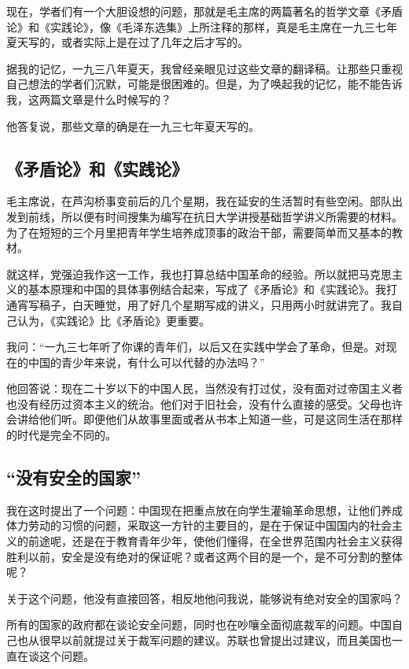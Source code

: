 现在，学者们有一个大胆设想的问题，那就是毛主席的两篇著名的哲学文章《矛盾论》和《实践论》，像《毛泽东选集》上所注释的那样，真是毛主席在一九三七年夏天写的，或者实际上是在过了几年之后才写的。

据我的记忆，一九三八年夏天，我曾经亲眼见过这些文章的翻译稿。让那些只重视自己想法的学者们沉默，可能是很困难的。但是，为了唤起我的记忆，能不能告诉我，这两篇文章是什么时候写的？

他答复说，那些文章的确是在一九三七年夏天写的。

\subsection{《矛盾论》和《实践论》}

毛主席说，在芦沟桥事变前后的几个星期，我在延安的生活暂时有些空闲。部队出发到前线，所以便有时间搜集为编写在抗日大学讲授基础哲学讲义所需要的材料。为了在短短的三个月里把青年学生培养成顶事的政治干部，需要简单而又基本的教材。

就这样，党强迫我作这一工作，我也打算总结中国革命的经验。所以就把马克思主义的基本原理和中国的具体事例结合起来，写成了《矛盾论》和《实践论》。我打通宵写稿子，白天睡觉，用了好几个星期写成的讲义，只用两小时就讲完了。我自己认为，《实践论》比《矛盾论》更重要。

我问：“一九三七年听了你课的青年们，以后又在实践中学会了革命，但是。对现在的中国的青少年来说，有什么可以代替的办法吗？”

他回答说：现在二十岁以下的中国人民，当然没有打过仗，没有面对过帝国主义者也没有经历过资本主义的统治。他们对于旧社会，没有什么直接的感受。父母也许会讲给他们听。即便他们从故事里面或者从书本上知道一些，可是这同生活在那样的时代是完全不同的。

\subsection{“没有安全的国家”}

我在这时提出了一个问题：中国现在把重点放在向学生灌输革命思想，让他们养成体力劳动的习惯的问题，采取这一方针的主要目的，是在于保证中国国内的社会主义的前途呢，还是在于教育青年少年，使他们懂得，在全世界范围内社会主义获得胜利以前，安全是没有绝对的保证呢？或者这两个目的是一个，是不可分割的整体呢？

关于这个问题，他没有直接回答，相反地他问我说，能够说有绝对安全的国家吗？

所有的国家的政府都在谈论安全问题，同时也在吵嚷全面彻底裁军的问题。中国自己也从很早以前就提过关于裁军问题的建议。苏联也曾提出过建议，而且美国也一直在谈这个问题。

